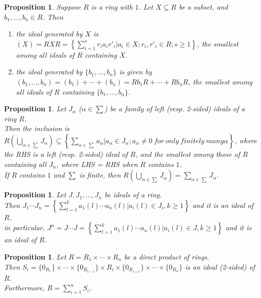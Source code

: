 \documentclass[a4paper,sfsidenotes,openany]{tufte-book}
\theoremstyle{theorem}
\newtheorem{proposition}[theorem]{Proposition}
\begin{document}
\begin{fullwidth}
\begin{proposition}
Suppose $R$ is a ring with $1$. Let $X \subseteq R$ be a subset, and $b_1, \ldots, b_n \in R$. Then
\begin{enumerate}[label=(\roman*),leftmargin=0pt, itemindent=4em, align=left]
\item the ideal generated by $X$ is $(X)=RXR=\left\{ \sum_{i=1}^{s} r_i a_i r'_i | a_i \in X; r_i, r'_i \in R; s \geq 1\right\}$, the smallest among all ideals of $R$ containing $X$.
\item the ideal generated by $\{b_1, \ldots, b_n\}$ is given by $(b_1, \ldots, b_n) = (b_1) + \cdots + (b_n) = Rb_1R + \cdots + Rb_nR$, the smallest among all ideals of $R$ containing $\{b_1, \ldots, b_n\}$.
\end{enumerate}
\end{proposition}
\>

\begin{proposition}
Let $J_\alpha$ ($\alpha \in \sum$) be a family of left (resp. 2-sided) ideals of a ring $R$.\\
Then the inclusion is $R(\bigcup\limits_{\alpha \in \sum}J_{\alpha}) \subseteq \left\{\sum_{\alpha \in \sum} a_{\alpha} | a_{\alpha} \in J_\alpha; a_{\alpha} \neq 0 \ for \ only \ finitely \ many \alpha \right\}$, where the RHS is a left (resp. 2-sided) ideal of $R$, and the smallest among those of $R$ containing all $J_\alpha$, where LHS = RHS when $R$ contains $1$.\\
If $R$ contains $1$ and $\sum$ is finite, then $R(\bigcup\limits_{\alpha \in \sum}J_{\alpha}) = \sum_{\alpha \in \sum} J_{\alpha}$.\\
\end{proposition}
\>

\begin{proposition}
Let $J, J_1, \ldots, J_n$ be ideals of a ring.\\
Then $J_1 \cdots J_n = \left\{ \sum_{l=1}^{k} a_1(l) \cdots a_n(l) | a_i(l) \in J_i, k \geq 1 \right\}$ and it is an ideal of $R$.\\
in particular, $J^n = J \cdots J = \left\{ \sum_{l=1}^{k} a_1(l) \cdots a_n(l) | a_i(l) \in J, k \geq 1 \right\}$ and it is an ideal of $R$.\\
\end{proposition}
\>

\begin{proposition}
Let $R = R_1 \times \cdots \times R_n$ be a direct product of rings.\\
Then $S_i = \{0_{R_1}\} \times \cdots \times \{0_{R_{i-1}}\} \times R_i \times \{0_{R_{i+1}}\} \times \cdots \times \{0_{R_n}\}$ is an ideal (2-sided) of $R$.\\
Furthermore, $R = \sum_{i=1}^{n} S_i$.\\ 
\end{proposition}
\>


\end{fullwidth}
\end{document}
